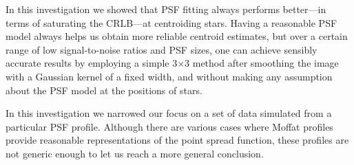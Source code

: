 In this investigation we showed that PSF fitting always performs better---in terms of saturating the CRLB---at centroiding stars. Having a reasonable PSF model always helps us obtain more reliable centroid estimates, but over a certain range of low signal-to-noise ratios and PSF sizes, one can achieve sensibly accurate results by employing a simple 3$\times$3 method after smoothing the image with a Gaussian kernel of a fixed width, and without making any assumption about the PSF model 
at the positions of stars.

In this investigation we narrowed our focus on a set of data simulated from a particular PSF profile. Although there are various cases where Moffat profiles provide reasonable representations of the point spread function, these profiles are not generic enough to let us reach a more general conclusion.


\clearpage

